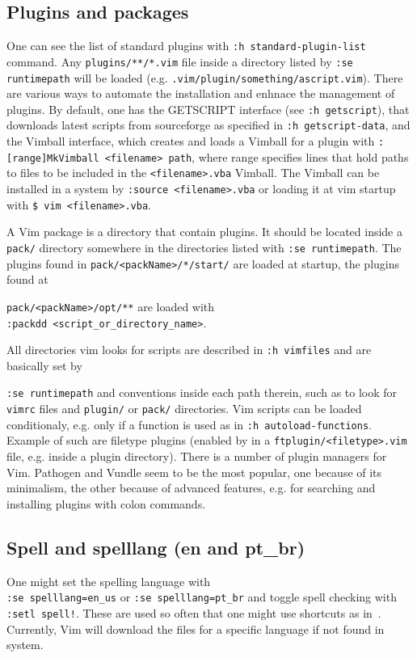 \documentclass{article}
\newcommand{\tttt}[1] {
	\texttt{#1}}
\begin{document}
\subsection{Plugins and packages}
One can see the list of standard plugins
with \tttt{:h standard-plugin-list} command.
Any \tttt{plugins/**/*.vim} file inside a directory
listed by \tttt{:se runtimepath} will be loaded
(e.g. \tttt{.vim/plugin/something/ascript.vim}).
There are various ways to automate the installation
and enhnace the management of plugins.
By default, one has the GETSCRIPT interface (see \tttt{:h getscript}),
that downloads latest scripts from sourceforge as specified in \tttt{:h getscript-data},
and the Vimball interface, which creates and loads a Vimball for a plugin
with \tttt{:[range]MkVimball <filename> path}, where range specifies lines
that hold paths to files to be included in the \tttt{<filename>.vba} Vimball.
The Vimball can be installed in a system by \tttt{:source <filename>.vba}
or loading it at vim startup with \tttt{\$ vim <filename>.vba}.

A Vim package is a directory that contain plugins.
It should be located inside a \tttt{pack/} directory
somewhere in the directories listed with \tttt{:se runtimepath}.
The plugins found in \tttt{pack/<packName>/*/start/} are loaded
at startup, the plugins found at
\tttt{pack/<packName>/opt/**} are loaded with\\
\tttt{:packdd <script\_or\_directory\_name>}.

All directories vim looks for scripts are described
in \tttt{:h vimfiles} and are basically set by
\tttt{:se runtimepath} and conventions inside
each path therein, such as to look for \tttt{vimrc} files
and \tttt{plugin/} or \tttt{pack/} directories.
Vim scripts can be loaded conditionaly,
e.g. only if a function is used as in \tttt{:h autoload-functions}.
Example of such are filetype plugins (enabled by in a \tttt{ftplugin/<filetype>.vim} file,
e.g. inside a plugin directory).
There is a number of plugin managers for Vim.
Pathogen and Vundle seem to be the most popular,
one because of its minimalism, the other because of
advanced features, e.g. for searching and installing plugins with
colon commands.

\subsection{Spell and spelllang (en and pt\_br)}
One might set the spelling language with\\ \tttt{:se spelllang=en\_us}
or \tttt{:se spelllang=pt\_br}
and toggle spell checking with \tttt{:setl spell!}.
These are used so often that one might use shortcuts as in~\cite{vimrc}.
Currently, Vim will download the files for a specific language if
not found in system.
\end{document}
